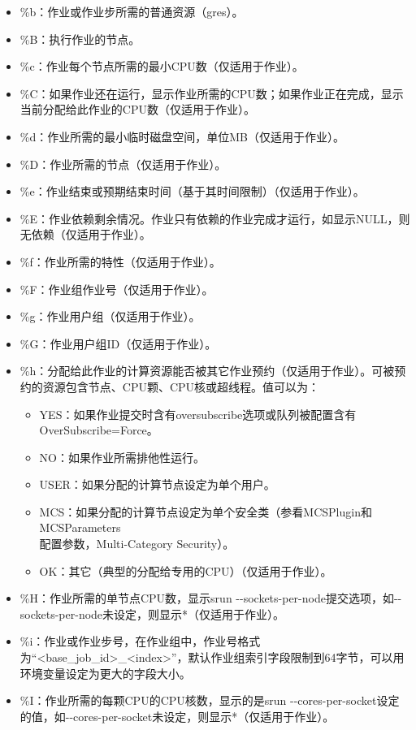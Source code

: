 \begin{itemize}
\begin{itemize}
\begin{itemize}
    \item \%b：作业或作业步所需的普通资源（gres）。
    \item \%B：执行作业的节点。
    \item \%c：作业每个节点所需的最小CPU数（仅适用于作业）。
    \item \%C：如果作业还在运行，显示作业所需的CPU数；如果作业正在完成，显示当前分配给此作业的CPU数（仅适用于作业）。
    \item \%d：作业所需的最小临时磁盘空间，单位MB（仅适用于作业）。
    \item \%D：作业所需的节点（仅适用于作业）。
    \item \%e：作业结束或预期结束时间（基于其时间限制）（仅适用于作业）。
    \item \%E：作业依赖剩余情况。作业只有依赖的作业完成才运行，如显示NULL，则无依赖（仅适用于作业）。
    \item \%f：作业所需的特性（仅适用于作业）。
    \item \%F：作业组作业号（仅适用于作业）。
    \item \%g：作业用户组（仅适用于作业）。
    \item \%G：作业用户组ID（仅适用于作业）。
    \item \%h：分配给此作业的计算资源能否被其它作业预约（仅适用于作业）。可被预约的资源包含节点、CPU颗、CPU核或超线程。值可以为：
\begin{itemize}
	\item YES：如果作业提交时含有oversubscribe选项或队列被配置含有\\OverSubscribe=Force。
   	\item NO：如果作业所需排他性运行。
   	\item USER：如果分配的计算节点设定为单个用户。
   	\item MCS：如果分配的计算节点设定为单个安全类（参看MCSPlugin和MCSParameters\\配置参数，Multi-Category Security）。
   	\item OK：其它（典型的分配给专用的CPU）（仅适用于作业）。
\end{itemize}
    \item \%H：作业所需的单节点CPU数，显示srun -{}-sockets-per-node提交选项，如-{}-sockets-per-node未设定，则显示*（仅适用于作业）。
    \item \%i：作业或作业步号，在作业组中，作业号格式为``<base\_job\_id>\_<index>''，默认作业组索引字段限制到64字节，可以用环境变量设定为更大的字段大小。
    \item \%I：作业所需的每颗CPU的CPU核数，显示的是srun -{}-cores-per-socket设定的值，如-{}-cores-per-socket未设定，则显示*（仅适用于作业）。

\end{itemize}
\end{itemize}
\end{itemize}
